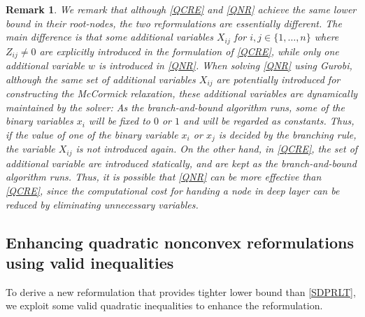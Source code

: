 \documentclass[pdflatex,sn-mathphys-num]{sn-jnl}%
\theoremstyle{thmstyleone}%
\theoremstyle{thmstyletwo}%
\newtheorem{remark}{Remark}%
\theoremstyle{thmstylethree}%
\begin{document}
\begin{remark}\label{remark_qcre_qnr}
	We remark that although \eqref{QCRE} and \eqref{QNR} achieve the same lower bound in their root-nodes, the two reformulations are essentially different. The main difference is that some additional variables $X_{ij}$ for $i,j\in\{1,\ldots,n\}$ where $Z_{ij}\neq 0$ are explicitly introduced in the formulation of \eqref{QCRE}, while only one additional variable $w$ is introduced in \eqref{QNR}. When solving \eqref{QNR} using Gurobi, although the same set of additional variables $X_{ij}$ are potentially introduced for constructing the McCormick relaxation, these additional variables are dynamically maintained by the solver: As the branch-and-bound algorithm runs, some of the binary variables $x_i$ will be fixed to $0$ or $1$ and will be regarded as constants. Thus, if the value of one of the binary variable $x_i$ or $x_j$ is decided by the branching rule, the variable $X_{ij}$ is not introduced again. On the other hand, in \eqref{QCRE}, the set of additional variable are introduced statically, and are kept as the branch-and-bound algorithm runs. Thus, it is possible that \eqref{QNR} can be more effective than \eqref{QCRE}, since %
	the computational cost for handing a node in deep layer can be reduced by eliminating unnecessary variables.
\end{remark}

\subsection{Enhancing quadratic nonconvex reformulations using valid inequalities}

To derive a new reformulation that provides tighter lower bound than \eqref{SDPRLT}, we  exploit some valid quadratic inequalities to enhance the reformulation.
\end{document}
